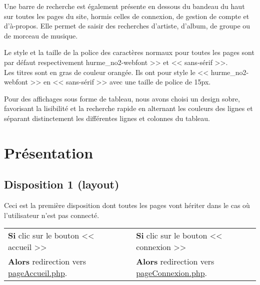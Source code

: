 \newpage

	\begin{paragraphe}
		Une barre de recherche est également présente en dessous du bandeau du haut sur toutes les pages du site, hormis celles de connexion, de gestion de compte et d'à-propos.
		Elle permet de saisir des recherches d'artiste, d'album, de groupe ou de morceau de musique.
	\end{paragraphe}

	\begin{paragraphe}
		Le style et la taille de la police des caractères normaux pour toutes les pages sont par défaut respectivement \og hurme\_no2-webfont >> et << sans-sérif >>.\\
		Les titres sont en gras de couleur orangée. Ils ont pour style le << hurme\_no2-webfont >> en << sans-sérif >> avec une taille de police de 15px.
    \end{paragraphe}


    \begin{paragraphe}
       Pour des affichages sous forme de tableau, nous avons choisi un design sobre, favorisant la lisibilité et la recherche rapide en alternant les couleurs des lignes
       et séparant distinctement les différentes lignes et colonnes du tableau.
    \end{paragraphe}

\newpage

\section{Présentation}
	\subsection{Disposition 1 (layout)}

		\begin{paragraphe}
			Ceci est la première disposition dont toutes les pages vont hériter dans le cas où l'utilisateur n'est pas connecté.
		\end{paragraphe}

        \begin{center}
            \begin{tabular}{l c | c l}
                \textbf{Si} clic sur le bouton << accueil >> & & & \textbf{Si} clic sur le bouton << connexion >> \\
                \textbf{Alors} redirection vers \underline{pageAccueil.php}. & & & \textbf{Alors} redirection vers \underline{pageConnexion.php}.
            \end{tabular}
        \end{center}
        
